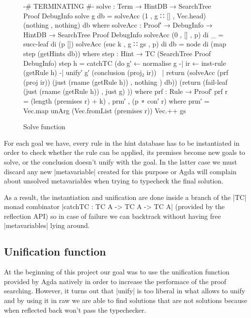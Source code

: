 \documentclass[a4paper]{article}
\begin{document}
\begin{figure}[h]
\small
\begin{code}
  {-# TERMINATING #-}
  solve : Term → HintDB → SearchTree Proof DebugInfo
  solve g db = solveAcc (1 , g ∷ [] , Vec.head) (nothing , nothing) db
    where
      solveAcc : Proof′ → DebugInfo → HintDB → SearchTree Proof DebugInfo
      solveAcc (0     ,     [] , p) di _  = succ-leaf di (p [])
      solveAcc (suc k , g ∷ gs , p) di db = node di (map step (getHints db))
        where
          step : Hint → TC (SearchTree Proof DebugInfo)
          step h = catchTC (do g′  ← normalise g
                            -| ir  ← inst-rule (getRule h)
                            -| unify′ g′ (conclusion (proj₂ ir))
                            ~| return (solveAcc (prf (proj ir)) (just (rname (getRule h)) , nothing ) db))
                            (return (fail-leaf (just (rname (getRule h)) , just g) ))
            where
              prf : Rule → Proof′
              prf r = (length (premises r) + k) , prm′ , (p ∘ con′ r)
                where
                  prm′ = Vec.map unArg (Vec.fromList (premises r))
                          Vec.++ gs
\end{code}
  \label{fig:solve}
  \caption{Solve function}
\end{figure}

For each goal we have, every rule in the hint database has to be instantiated in
order to check whether the rule can be applied, its premises become new goals to
solve, or the conclusion doesn't unify with the goal. In the latter case we must
discard any new |metavariable| created for this purpose or Agda will complain
about unsolved metavariables when trying to typecheck the final solution.

As a result, the instantiation and unification are done inside a branch of the
|TC| monad combinator |catchTC : TC A -> TC A -> TC A| (provided by the
reflection API) so in case of failure we can backtrack without having
free |metavariables| lying around.

\subsection{Unification function}

At the beginning of this project our goal was to use the unification function
provided by Agda natively in order to increase the performace of the proof
searching. However, it turns out that |unify| is too liberal in what allows to
unify and by using it in raw we are able to find solutions that are not
solutions because when reflected back won't pass the typechecker.
\end{document}
